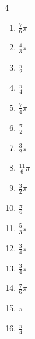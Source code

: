 \begin{multicols}{4}
\begin{enumerate}
  \item $\displaystyle \frac{7}{6}\pi$

  \item $\displaystyle \frac{4}{3}\pi$

  \item $\displaystyle \frac{\pi}{2}$

  \item $\displaystyle \frac{\pi}{4}$

  \item $\displaystyle \frac{7}{4}\pi$

  \item $\displaystyle \frac{\pi}{2}$

  \item $\displaystyle \frac{3}{2}\pi$

  \item $\displaystyle \frac{11}{6}\pi$

  \item $\displaystyle \frac{3}{2}\pi$

  \item $\displaystyle \frac{\pi}{6}$

  \item $\displaystyle \frac{5}{3}\pi$

  \item $\displaystyle \frac{3}{4}\pi$

  \item $\displaystyle \frac{3}{4}\pi$

  \item $\displaystyle \frac{7}{6}\pi$

  \item $\displaystyle \pi$

\columnbreak %

  \item $\displaystyle \frac{\pi}{4}$


\end{enumerate}
\end{multicols}
